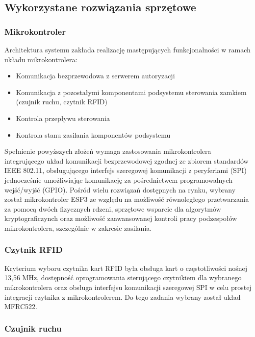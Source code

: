         \subsection{Wykorzystane rozwiązania sprzętowe}

            \subsubsection{Mikrokontroler}

                Architektura systemu zakłada realizację mastępujących funkcjonalności w ramach układu mikrokontrolera:
                \begin{itemize}
                    \item Komunikacja bezprzewodowa z serwerem autoryzacji
                    \item Komunikacja z pozostałymi komponentami podsystemu sterowania zamkiem (czujnik ruchu, czytnik RFID)
                    \item Kontrola przepływu sterowania
                    \item Kontrola stanu zasilania komponentów podsystemu
                \end{itemize}
                Spełnienie powyższych złożeń wymaga zastosowania mikrokontrolera integrującego układ komunikacji bezprzewodowej zgodnej ze zbiorem standardów IEEE 802.11, obsługującego interfejs szeregowej komunikacji z peryferiami (SPI) jednocześnie umożliwiając komunikację za pośrednictwem programowalnych wejść/wyjść (GPIO). Pośród wielu rozwiązań  dostępnych na rynku, wybrany został mikrokontroler ESP3 ze względu na możliwość równoległego przetwarzania za pomocą dwóch fizycznych rdzeni, sprzętowe wsparcie dla algorytmów kryptograficzynch oraz możliwość zaawansowanej kontroli pracy podzespołów mikrokontrolera, szczególnie w zakresie zasilania.

            \subsubsection{Czytnik RFID}

                Kryterium wyboru czytnika kart RFID była obsługa kart o częstotliwości nośnej 13,56 MHz, dostępność oprogramowania sterującego czytnikiem dla wybranego mikrokontrolera oraz obsługa interfejsu komunikacji szeregowej SPI w celu prostej integracji czytnika z mikrokontrolerem. Do tego zadania wybrany został układ MFRC522.

            \subsubsection{Czujnik ruchu}

